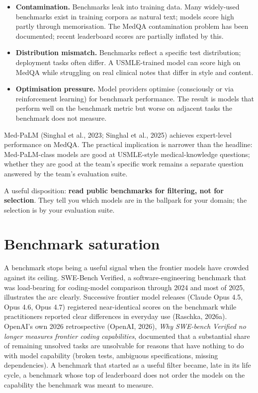 \documentclass[
  letterpaper,
  11pt]{scrbook}
\providecommand{\tightlist}{%
  \setlength{\itemsep}{0pt}\setlength{\parskip}{0pt}}
\begin{document}
\begin{itemize}
\tightlist
\item
  \textbf{Contamination.} Benchmarks leak into training data. Many
  widely-used benchmarks exist in training corpora as natural text;
  models score high partly through memorisation. The MedQA contamination
  problem has been documented; recent leaderboard scores are partially
  inflated by this.
\item
  \textbf{Distribution mismatch.} Benchmarks reflect a specific test
  distribution; deployment tasks often differ. A USMLE-trained model can
  score high on MedQA while struggling on real clinical notes that
  differ in style and content.
\item
  \textbf{Optimisation pressure.} Model providers optimise (consciously
  or via reinforcement learning) for benchmark performance. The result
  is models that perform well on the benchmark metric but worse on
  adjacent tasks the benchmark does not measure.
\end{itemize}

Med-PaLM (Singhal et al., 2023; Singhal et al., 2025) achieves
expert-level performance on MedQA. The practical implication is narrower
than the headline: Med-PaLM-class models are good at USMLE-style
medical-knowledge questions; whether they are good at the team's
specific work remains a separate question answered by the team's
evaluation suite.

A useful disposition: \textbf{read public benchmarks for filtering, not
for selection}. They tell you which models are in the ballpark for your
domain; the selection is by your evaluation suite.

\section{Benchmark saturation}\label{benchmark-saturation}

A benchmark stops being a useful signal when the frontier models have
crowded against its ceiling. SWE-Bench Verified, a software-engineering
benchmark that was load-bearing for coding-model comparison through 2024
and most of 2025, illustrates the arc clearly. Successive frontier model
releases (Claude Opus 4.5, Opus 4.6, Opus 4.7) registered near-identical
scores on the benchmark while practitioners reported clear differences
in everyday use (Raschka, 2026a). OpenAI's own 2026 retrospective
(OpenAI, 2026), \emph{Why SWE-bench Verified no longer measures frontier
coding capabilities}, documented that a substantial share of remaining
unsolved tasks are unsolvable for reasons that have nothing to do with
model capability (broken tests, ambiguous specifications, missing
dependencies). A benchmark that started as a useful filter became, late
in its life cycle, a benchmark whose top of leaderboard does not order
the models on the capability the benchmark was meant to measure.
\end{document}

